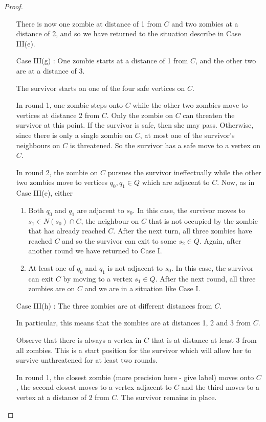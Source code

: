 \begin{proof}
\begin{enumerate}[I.]
There is now one zombie at distance of 1 from $C$ and two zombies at a distance of 2, and so we have returned to the situation describe in Case III(e).

\item[Case III(g)]: One zombie starts at a distance of 1 from $C$, and the other two are at a distance of 3.

The survivor starts on one of the four safe vertices on $C$.

In round 1, one zombie steps onto $C$ while the other two zombies move to vertices at distance 2 from $C$.
Only the zombie on $C$ can threaten the survivor at this point. If the survivor is safe, then she may pass. Otherwise, since there is
only a single zombie on $C$, at most one of the survivor's neighbours on $C$ is threatened.
So the survivor has a safe move to a vertex on $C$.

In round 2, the zombie on $C$ pursues the survivor ineffectually while the other two zombies move to vertices $q_0, q_1 \in Q$ which are
adjacent to $C$. Now, as in Case III(e), either

\begin{enumerate}
\item Both $q_0$ and $q_1$ are adjacent to $s_0$. In this case, the survivor moves to $s_1 \in N(s_0) \cap C$, the neighbour on $C$ that is not occupied
by the zombie that has already reached $C$. After the next turn, all three zombies have reached $C$ and so the survivor can
exit to some $s_2 \in Q$. Again, after another round we have returned to Case I.

\item At least one of $q_0$ and $q_1$ is not adjacent to $s_0$. In this case, the survivor can exit $C$ by moving to a vertex $s_1 \in Q$. After the next
round, all three zombies are on $C$ and we are in a situation like Case I.
\end{enumerate}

\item[Case III(h)]: The three zombies are at different distances from $C$.

In particular, this means that the zombies are at distances 1, 2 and 3 from $C$.

Observe that there is always a vertex in $C$ that is at distance at least 3 from all zombies. This is a start position for the survivor which
will allow her to survive unthreatened for at least two rounds.

In round 1, the closest zombie (more precision here - give label) moves onto $C$, the second closest moves to a vertex adjacent to $C$ and the third
moves to a vertex at a distance of 2 from $C$. The survivor remains in place.


\end{enumerate}
\end{proof}
